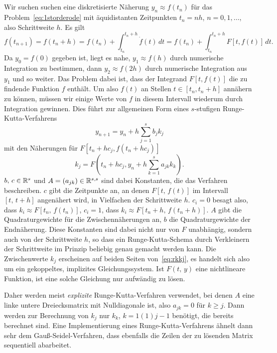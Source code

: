 \subsection{}

Wir suchen suchen eine diskretisierte Näherung $y_n \approx f(t_n)$
für das Problem~\eqref{eq:1storderode} mit
äquidistanten Zeitpunkten $t_n=n h$, $n=0,1,\ldots$, also Schrittweite
$h$. Es gilt
\begin{equation}
  f(t_{n+1}) = f(t_n+h) = f(t_n) + \int_{t_n}^{t_n+h} \dot f(t)\,dt
  =  f(t_n) + \int_{t_n}^{t_n+h} F[t, f(t)]\,dt.
\end{equation}
Da $y_0 = f(0)$ gegeben ist, liegt es nahe, $y_1 \approx f(h)$ durch
numerische Integration zu bestimmen, dann $y_2 \approx f(2h)$ durch
numerische Integration aus $y_1$ und so weiter. Das Problem dabei ist,
dass der Integrand $F[t, f(t)]$ die zu findende Funktion $f$
enthält. Um also $f(t)$ an Stellen $t\in [t_n, t_n + h]$ annähern zu
können, müssen wir einige Werte von $f$ in diesem Intervall wiederum
durch Integration gewinnen. Dies führt zur allgemeinen Form eines
$s$-stufigen Runge-Kutta-Verfahrens
\begin{equation}
  y_{n+1} = y_n + h\sum_{j=1}^s b_j k_j
\end{equation}
mit den Näherungen für $F[t_n + hc_j, f(t_n + h c_j)]$
\begin{equation}
  \label{eq:rkkj}
  k_j = F\left(t_n + h c_j, y_n + h \sum_{k=1}^s a_{jk} k_k\right).
\end{equation}
$b,\,c\in\mathbb{R}^s$ und $A=(a_{jk})\in\mathbb{R}^{s,s}$ sind dabei Konstanten,
die das Verfahren beschreiben. $c$ gibt die Zeitpunkte an, an denen
$F[t,\,f(t)]$ im Intervall $[t,\,t+h]$ angenähert wird, in Vielfachen
der Schrittweite $h$. $c_i=0$ besagt also, dass $k_i\approx
F[t_n,\,f(t_n)]$, $c_i=1$, dass $k_i\approx F[t_n + h,\,f(t_n + h)]$.
$A$ gibt die Quadraturgewichte für die Zwischennäherungen an, $b$ die
Quadraturgewichte der Endnäherung. Diese Konstanten sind dabei nicht
nur von $F$ unabhängig, sondern auch von der Schrittweite $h$, so dass
ein Runge-Kutta-Schema durch Verkleinern der Schrittweite im Prinzip
beliebig genau gemacht werden kann.  Die Zwischenwerte $k_j$
erscheinen auf beiden Seiten von~\eqref{eq:rkkj}, es handelt sich also
um ein gekoppeltes, implizites Gleichungssystem.  Ist
$F(t,\,y)$ eine nichtlineare Funktion, ist eine solche Gleichung nur
aufwändig zu lösen.

%
Daher werden meist \emph{explizite} Runge-Kutta-Verfahren verwendet,
bei denen $A$ eine linke untere Dreiecksmatrix mit Nulldiagonale ist,
also $a_{jk} = 0$ für $k\ge j$. Dann werden zur Berechnung von $k_j$
nur $k_k$, $k=1(1)j-1$ benötigt, die bereits berechnet sind. Eine
Implementierung eines Runge-Kutta-Verfahrens ähnelt dann sehr dem
Gauß-Seidel-Verfahren, dass ebenfalls die Zeilen der zu lösenden
Matrix sequentiell abarbeitet.

